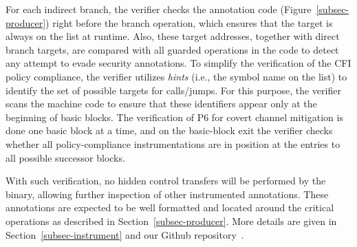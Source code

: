 For each indirect branch, the verifier checks the annotation code (Figure~\ref{subsec-producer}) right before the branch operation, which ensures that the target is always on the list at runtime. Also, these target addresses, together with direct branch targets, are compared with all guarded operations in the code to detect any attempt to evade security annotations. To simplify the verification of the CFI policy compliance, the verifier utilizes \textit{hints} (i.e., the symbol  name on the list) to identify the set of possible targets for calls/jumps. For this purpose, the verifier scans the machine code  to ensure that these identifiers appear only at the beginning of basic blocks. The verification of P6 for covert channel mitigation is done one basic block at a time, and on the basic-block exit the verifier checks whether all policy-compliance instrumentations are in position at the entries to all possible successor blocks.


With such verification, no hidden control transfers will be performed by the binary, allowing further inspection of other instrumented annotations. These annotations are expected to be well formatted and located around the critical operations as described in Section~\ref{subsec-producer}. %
More details are given in Section~\ref{subsec-instrument} and our Github repository~\cite{our-prototype}.




